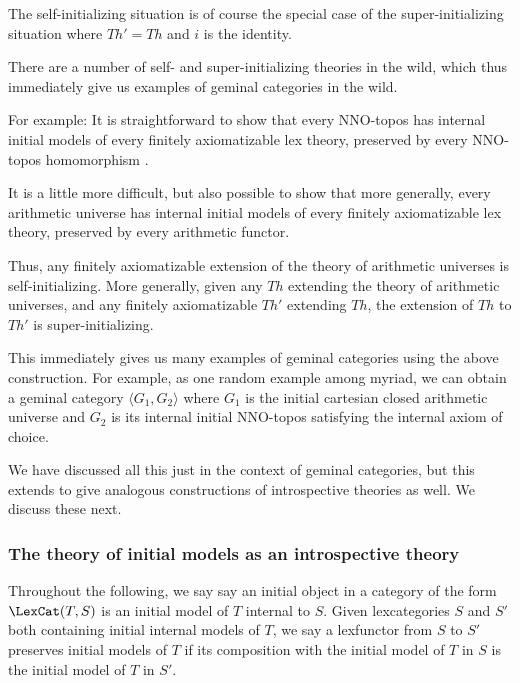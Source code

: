 The self-initializing situation is of course the special case of the super-initializing situation where $Th' = Th$ and $i$ is the identity.

There are a number of self- and super-initializing theories in the wild, which thus immediately give us examples of geminal categories in the wild.

For example: It is straightforward to show that every NNO-topos has internal initial models of every finitely axiomatizable lex theory, preserved by every NNO-topos homomorphism .

It is a little more difficult, but also possible to show that more generally, every arithmetic universe has internal initial models of every finitely axiomatizable lex theory, preserved by every arithmetic functor. 

Thus, any finitely axiomatizable extension of the theory of arithmetic universes is self-initializing. More generally, given any $Th$ extending the theory of arithmetic universes, and any finitely axiomatizable $Th'$ extending $Th$, the extension of $Th$ to $Th'$ is super-initializing. 

This immediately gives us many examples of geminal categories using the above construction. For example, as one random example among myriad, we can obtain a geminal category $\langle G_1, G_2 \rangle$ where $G_1$ is the initial cartesian closed arithmetic universe and $G_2$ is its internal initial NNO-topos satisfying the internal axiom of choice.


We have discussed all this just in the context of geminal categories, but this extends to give analogous constructions of introspective theories as well. We discuss these next.


\subsubsection{The theory of initial models as an introspective theory}
Throughout the following, we say say an initial object in a category of the form $\LexCat(T, S)$ is an initial model of $T$ internal to $S$. Given lexcategories $S$ and $S'$ both containing initial internal models of $T$, we say a lexfunctor from $S$ to $S'$ preserves initial models of $T$ if its composition with the initial model of $T$ in $S$ is the initial model of $T$ in $S'$.

